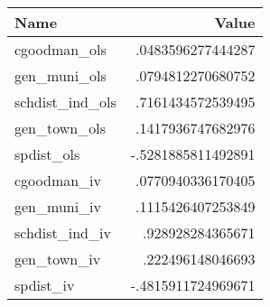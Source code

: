 \begin{tabular}{|l|r|}
\hline
Name & Value \\
\hline
cgoodman_ols & .0483596277444287 \\
gen_muni_ols & .0794812270680752 \\
schdist_ind_ols & .7161434572539495 \\
gen_town_ols & .1417936747682976 \\
spdist_ols & -.5281885811492891 \\
cgoodman_iv & .0770940336170405 \\
gen_muni_iv & .1115426407253849 \\
schdist_ind_iv & .928928284365671 \\
gen_town_iv & .222496148046693 \\
spdist_iv & -.4815911724969671 \\
\end{tabular}
